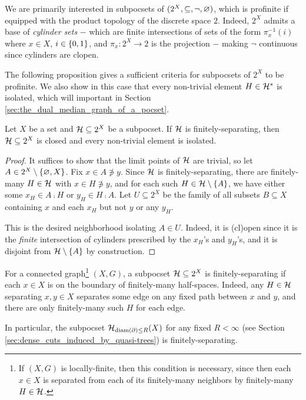 \documentclass{amsart}
\begin{document}
    We are primarily interested in subpocsets of $(2^X,\subseteq,\lnot,\em)$, which is profinite if equipped with the product topology of the discrete space $2$. Indeed, $2^X$ admits a base of \textit{cylinder sets} $-$ which are finite intersections of sets of the form $\pi^{-1}_x(i)$ where $x\in X$, $i\in\l\{0,1\r\}$, and $\pi_x:2^X\to2$ is the projection $-$ making $\lnot$ continuous since cylinders are clopen. {\color{red}{Show that it is totally order-disconnected.}}

    The following proposition gives a sufficient criteria for subpocsets of $2^X$ to be profinite. We also show in this case that every non-trivial element $H\in\mc{H}^\ast$ is isolated, which will important in Section \ref{sec:the_dual_median_graph_of_a_pocset}.

    \begin{proposition}\label{prp:finitely-separating_non-trivial_isolated}
        Let $X$ be a set and $\mc{H}\subseteq2^X$ be a subpocset. If $\mc{H}$ is finitely-separating, then $\mc{H}\subseteq2^X$ is closed and every non-trivial element is isolated.
    \end{proposition}
    \begin{proof}
        It suffices to show that the limit points of $\mc{H}$ are trivial, so let $A\in2^X\comp\l\{\em,X\r\}$. Fix $x\in A\not\ni y$. Since $\mc{H}$ is finitely-separating, there are finitely-many $H\in\mc{H}$ with $x\in H\not\ni y$, and for each such $H\in\mc{H}\comp\l\{A\r\}$, we have either some $x_H\in A\comp H$ or $y_H\in H\comp A$. Let $U\subseteq2^X$ be the family of all subsets $B\subseteq X$ containing $x$ and each $x_H$ but not $y$ or any $y_H$.

        This is the desired neighborhood isolating $A\in U$. Indeed, it is (cl)open since it is the \textit{finite} intersection of cylinders prescribed by the $x_H$'s and $y_H$'s, and it is disjoint from $\mc{H}\comp\l\{A\r\}$ by construction.
    \end{proof}

    \begin{example}\label{exa:finitely_separating_iff_on_boundary_of_finite}
        For a connected graph\footnote{If $(X,G)$ is locally-finite, then this condition is necessary, since then each $x\in X$ is separated from each of its finitely-many neighbors by finitely-many $H\in\mc{H}$.} $(X,G)$, a subpocset $\mc{H}\subseteq2^X$ is finitely-separating if each $x\in X$ is on the boundary of finitely-many half-spaces. Indeed, any $H\in\mc{H}$ separating $x,y\in X$ separates some edge on any fixed path between $x$ and $y$, and there are only finitely-many such $H$ for each edge.

        In particular, the subpocset $\mc{H}_{\diam(\del)\leq R}(X)$ for any fixed $R<\infty$ (see Section \ref{sec:dense_cuts_induced_by_quasi-trees}) is finitely-separating.
    \end{example}
\end{document}
